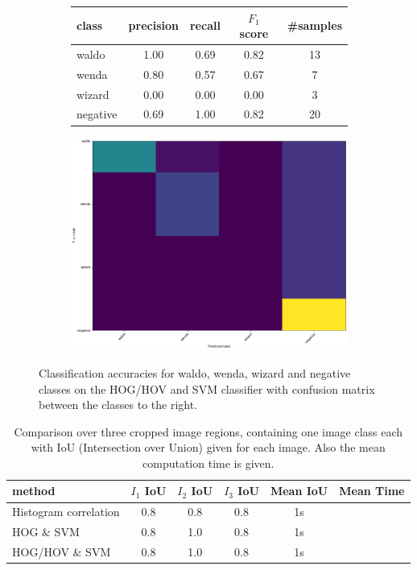 \documentclass[11pt]{article}
\begin{document}
\begin{figure}[]
    \centering
    \begin{subfigure}{0.6\linewidth}
    \begin{tabular}{lcccc}
        \toprule
        class & precision & recall & \( F_1 \) score & \#samples \\
        \midrule
           waldo &  1.00 &  0.69 & 0.82 &  13 \\
           wenda &  0.80 &  0.57 & 0.67 &   7 \\
          wizard &  0.00 &  0.00 & 0.00 &   3 \\
        negative &  0.69 &  1.00 & 0.82 &  20 \\
        \bottomrule
    \end{tabular}
    \end{subfigure}
    \begin{subfigure}{0.35\linewidth}
    \includegraphics[width =\linewidth]{figures/confusion_matrix}
    \end{subfigure}

    \caption{Classification accuracies for waldo, wenda, wizard and negative classes on the HOG/HOV and SVM classifier
    with confusion matrix between the classes to the right.}
    \label{tab:classification_acc}
\end{figure}

\begin{table}[]
    \centering
    \begin{tabular}{lccccc}
        \toprule
        method & \( I_1 \) IoU & \( I_2 \) IoU & \( I_3 \) IoU & Mean IoU & Mean Time \\
        \midrule
        Histogram correlation   & 0.8   & 0.8 & 0.8 & 1s \\
        HOG \& SVM              &0.8    & 1.0 & 0.8 & 1s \\
        HOG/HOV \& SVM          & 0.8   & 1.0 & 0.8 & 1s \\
        \bottomrule
    \end{tabular}
    \caption{Comparison over three cropped image regions, containing one image class each with IoU (Intersection over Union) given for each image.
    Also the mean computation time is given.}
    \label{tab:dataset-stats}
\end{table}
\end{document}
